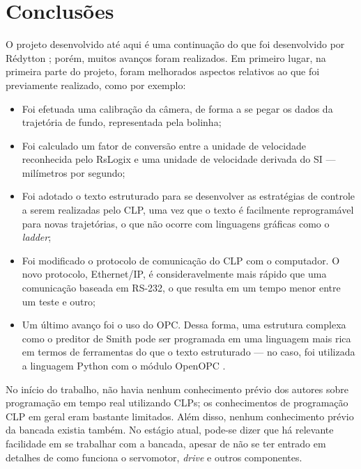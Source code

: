 


\chapter{Conclusões}

\label{CapConclusoes}

O projeto desenvolvido até aqui é uma continuação do que foi desenvolvido por Rédytton \cite{redytton}; porém, muitos avanços foram realizados. Em primeiro lugar, na primeira parte do projeto, foram melhorados aspectos relativos ao que foi previamente realizado, como por exemplo:
\begin{itemize}
\item Foi efetuada uma calibração da câmera, de forma a se pegar os dados da trajetória de fundo, representada pela bolinha;
\item Foi calculado um fator de conversão entre a unidade de velocidade reconhecida pelo RsLogix e uma unidade de velocidade derivada do SI --- milímetros por segundo;
\item Foi adotado o texto estruturado para se desenvolver as estratégias de controle a serem realizadas pelo CLP, uma vez que o texto é facilmente reprogramável para novas trajetórias, o que não ocorre com linguagens gráficas como o \textit{ladder};
\item Foi modificado o protocolo de comunicação do CLP com o computador. O novo protocolo, Ethernet/IP, é consideravelmente mais rápido que uma comunicação baseada em RS-232, o que resulta em um tempo menor entre um teste e outro;
\item Um último avanço foi o uso do OPC. Dessa forma, uma estrutura complexa como o preditor de Smith pode ser programada em uma linguagem mais rica em termos de ferramentas do que o texto estruturado --- no caso, foi utilizada a linguagem Python com o módulo OpenOPC \cite{OpenOPC}.
\end{itemize}

No início do trabalho, não havia nenhum conhecimento prévio dos autores sobre programação em tempo real utilizando CLPs; os conhecimentos de programação CLP em geral eram bastante limitados. Além disso, nenhum conhecimento prévio da bancada existia também. No estágio atual, pode-se dizer que há relevante facilidade em se trabalhar com a bancada, apesar de não se ter entrado em detalhes de como funciona o servomotor, \textit{drive} e outros componentes.


